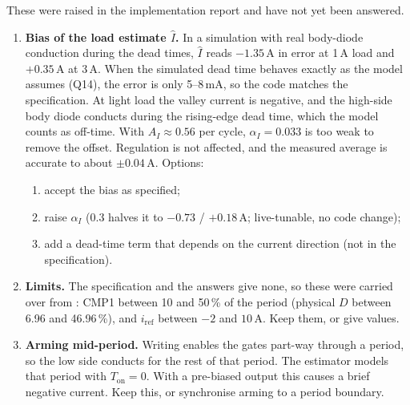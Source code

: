 \documentclass[11pt]{article}
\newcommand{\code}[1]{\texttt{\detokenize{#1}}}
\begin{document}
These were raised in the implementation report and have not yet been
answered.

\begin{enumerate}[label=O\arabic*., leftmargin=2.5em]
\item \textbf{Bias of the load estimate $\hat{I}$.} In a simulation
with real body-diode conduction during the dead times, $\hat{I}$ reads
$-1.35\,\mathrm{A}$ in error at 1\,A load and $+0.35\,\mathrm{A}$ at
3\,A. When the simulated dead time behaves exactly as the model assumes
(Q14), the error is only 5--8\,mA, so the code matches the
specification. At light load the valley current is negative, and the
high-side body diode conducts during the rising-edge dead time, which
the model counts as off-time. With $A_I\approx 0.56$ per cycle,
$\alpha_I=0.033$ is too weak to remove the offset. Regulation is not
affected, and the measured average is accurate to about
$\pm 0.04\,\mathrm{A}$. Options:
  \begin{enumerate}
  \item accept the bias as specified;
  \item raise $\alpha_I$ (0.3 halves it to $-0.73$ / $+0.18\,\mathrm{A}$;
        live-tunable, no code change);
  \item add a dead-time term that depends on the current direction
        (not in the specification).
  \end{enumerate}
\item \textbf{Limits.} The specification and the answers give none,
so these were carried over from \code{Buck_Voltage_Mode}: CMP1 between
10 and 50\,\% of the period (physical $D$ between 6.96 and 46.96\,\%),
and $i_{\mathrm{ref}}$ between $-2$ and $10\,\mathrm{A}$. Keep them, or
give values.
\item \textbf{Arming mid-period.} Writing \code{command = 1} enables
the gates part-way through a period, so the low side conducts for the
rest of that period. The estimator models that period with
$T_{\mathrm{on}}=0$. With a pre-biased output this causes a brief
negative current. Keep this, or synchronise arming to a period
boundary.
\end{enumerate}
\end{document}
